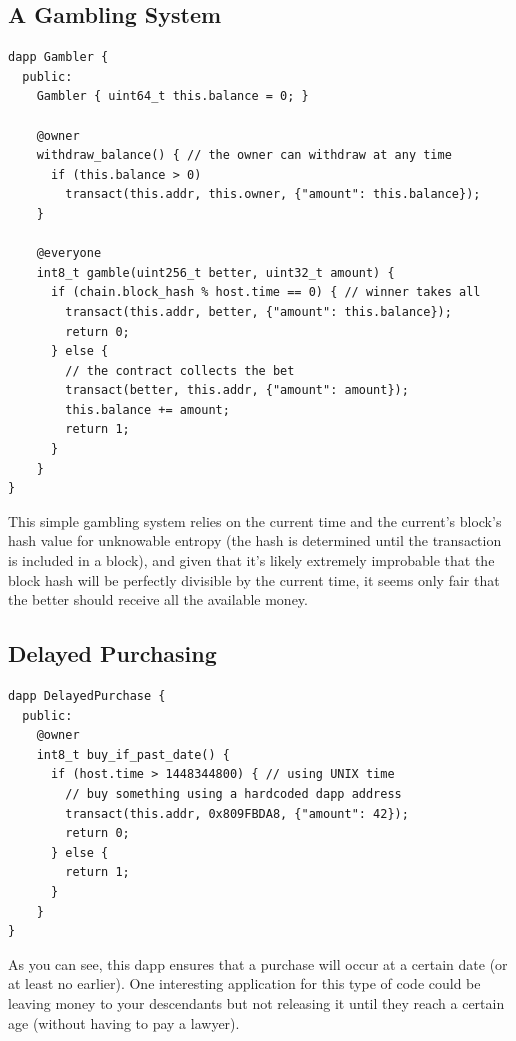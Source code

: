 \documentclass[letterpaper]{article}
\begin{document}
\subsection{A Gambling System}
\begin{lstlisting}
dapp Gambler {
  public:
    Gambler { uint64_t this.balance = 0; }
    
    @owner
    withdraw_balance() { // the owner can withdraw at any time
      if (this.balance > 0)
        transact(this.addr, this.owner, {"amount": this.balance});
    }
    
    @everyone
    int8_t gamble(uint256_t better, uint32_t amount) {
      if (chain.block_hash % host.time == 0) { // winner takes all
        transact(this.addr, better, {"amount": this.balance});
        return 0;
      } else {
        // the contract collects the bet
        transact(better, this.addr, {"amount": amount});
        this.balance += amount;
        return 1;
      }
    }
}
\end{lstlisting}
This simple gambling system relies on the current time and the current's block's hash value for unknowable entropy (the hash is determined until the transaction is included in a block), and given that it's likely extremely improbable that the block hash will be perfectly divisible by the current time, it seems only fair that the better should receive all the available money.
\newline

\subsection{Delayed Purchasing}
\begin{lstlisting}
dapp DelayedPurchase {
  public:
    @owner
    int8_t buy_if_past_date() {
      if (host.time > 1448344800) { // using UNIX time
        // buy something using a hardcoded dapp address
        transact(this.addr, 0x809FBDA8, {"amount": 42});
        return 0;
      } else {
        return 1;
      }
    }
}
\end{lstlisting}
As you can see, this dapp ensures that a purchase will occur at a certain date (or at least no earlier). One interesting application for this type of code could be leaving money to your descendants but not releasing it until they reach a certain age (without having to pay a lawyer).
\newline
\end{document}
